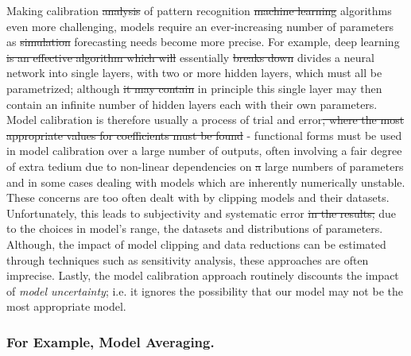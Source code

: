\documentclass[10pt]{article}[draft]
\begin{document}
Making calibration \st{analysis} of pattern recognition \st{machine learning} algorithms even more challenging, models require an ever-increasing number of parameters as \st{simulation} forecasting needs become more precise.  For example, deep learning \st{is an effective algorithm which will} essentially \st{ breaks down} divides a neural network into single layers, with two or more hidden layers, which must all be parametrized; although \st{it may contain} in principle this single layer may then contain an infinite number of hidden layers each with their own parameters. Model calibration is therefore usually a process of trial and error\st{, where the most appropriate values for coefficients must be found} - functional forms must be used in model calibration over a large number of outputs, often involving a fair degree of extra tedium due to non-linear dependencies on \st{a} large numbers of parameters and in some cases dealing with models which are inherently numerically unstable. These concerns are too often dealt with by clipping models and  their datasets. Unfortunately, this  leads to subjectivity and systematic error \st{in the results;} due to the choices in model's range, the datasets and distributions of parameters.
Although, the impact of model clipping and data reductions  can be estimated through techniques such as sensitivity analysis, these approaches are often imprecise. Lastly, the model calibration approach routinely discounts the impact of \emph{model uncertainty}; i.e. it ignores the possibility that our model may not be the most appropriate model. 




\subsubsection*{For Example, Model Averaging.}
\end{document}
